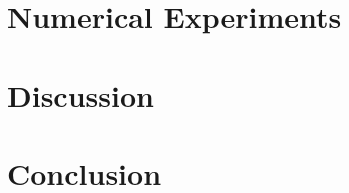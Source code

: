 \documentclass[UKenglish]{book}
\begin{document}
\chapter{Numerical Experiments}\label{chap:numerical_experiments}


\chapter{Discussion}

%
%
%
%
%

%

%

% 
% 
% 



\chapter*{Conclusion}\label{chap:conclusion}

\backmatter{}
\end{document}
